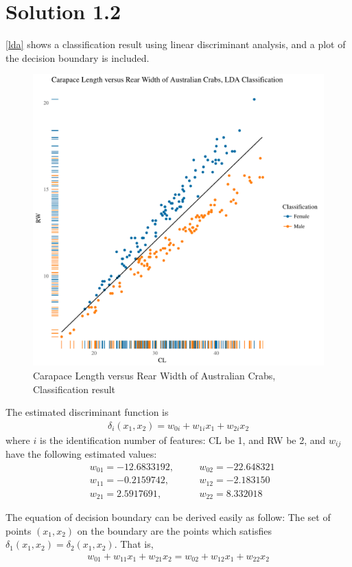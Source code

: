 \documentclass[11pt,english]{article}
\begin{document}
\section*{Solution 1.2}
\autoref{lda} shows a classification result using linear discriminant
analysis, and a plot of the decision boundary is included.

\begin{figure}[H]
  \centering
  \includegraphics[width = 1.13\textwidth]{lda.pdf}
  \caption{Carapace Length versus Rear Width of Australian Crabs,
    Classification result}
  \label{lda}
\end{figure}

The estimated discriminant function is
\begin{align*}
  \delta_i(x_1, x_2) = w_{0i} + w_{1i}x_1 + w_{2i}x_2
\end{align*}
where $i$ is the identification number of features: CL be 1, and RW be 2,
and $w_{ij}$ have the following estimated values:
\begin{align*}
&w_{01} = -12.6833192,&\quad& w_{02} = -22.648321 \\
&w_{11} = -0.2159742,&\quad& w_{12} = -2.183150 \\
&w_{21} = 2.5917691,&\quad& w_{22} = 8.332018
\end{align*}

The equation of decision boundary can be derived easily as follow:
The set of points $(x_1, x_2)$ on the boundary are the points which
satisfies $\delta_1(x_1, x_2) = \delta_2(x_1, x_2)$. That is,
\begin{align*}
  w_{01} + w_{11}x_1 + w_{21}x_2 = w_{02} + w_{12}x_1 + w_{22}x_2
\end{align*}
\end{document}
